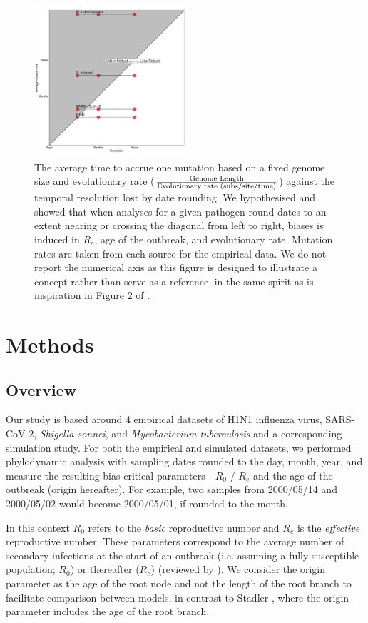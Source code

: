 \documentclass{article}
\begin{document}
\begin{spacing}{1.5}
\begin{figure}[!ht]
    \centering
    \includegraphics[width = 0.5\textwidth]{plane.pdf}
    \caption{The average time to accrue one mutation based on a fixed genome size and evolutionary rate ($\frac{\textnormal{Genome Length}}{\textnormal{Evolutionary rate (subs/site/time)}}$) against the temporal resolution lost by date rounding. We hypothesised and showed that when analyses for a given pathogen round dates to an extent nearing or crossing the diagonal from left to right, biases is induced in $R_e$, age of the outbreak, and evolutionary rate. Mutation rates are taken from each source for the empirical data. We do not report the numerical axis as this figure is designed to illustrate a concept rather than serve as a reference, in the same spirit as is inspiration in Figure 2 of \citet{biek_measurably_2015}.}
    \label{fig:plane}
\end{figure}


\section*{Methods}
\subsection*{Overview}
Our study is based around 4 empirical datasets of H1N1 influenza virus, SARS-CoV-2, \textit{Shigella sonnei}, and \textit{Mycobacterium tuberculosis} and a corresponding simulation study. For both the empirical and simulated datasets, we performed phylodynamic analysis with sampling dates rounded to the day, month, year, and measure the resulting bias critical parameters - $R_0$ / $R_e$ and the age of the outbreak (origin hereafter). For example, two samples from 2000/05/14 and 2000/05/02 would become 2000/05/01, if rounded to the month. 

In this context $R_0$ refers to the \textit{basic} reproductive number and $R_e$ is the \textit{effective} reproductive number. These parameters correspond to the average number of secondary infections at the start of an outbreak (i.e. assuming a fully susceptible population; $R_0$) or thereafter ($R_e$) (reviewed by \citep{featherstone2022epidemiological, du2015getting, kuhnert2011phylogenetic}). We consider the origin parameter as the age of the root node and not the length of the root branch to facilitate comparison between models, in contrast to Stadler \citet{stadler2012estimating}, where the origin parameter includes the age of the root branch.


\end{spacing}
\end{document}
